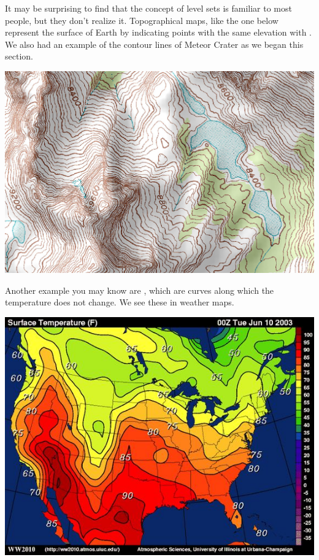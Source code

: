 \documentclass{ximera}
\begin{document}


It may be surprising to find that the concept of level sets is
familiar to most people, but they don't realize it.  Topographical
maps, like the one below represent the surface of Earth by
indicating points with the same elevation with .  We also had an example of the contour lines of Meteor 
  Crater as we began this section.

\begin{image}%
  \includegraphics{topomap.jpg}
\end{image}

Another example you may know are , which are curves along which the
temperature does not change. We see these in weather maps.

\begin{image}
  \includegraphics{isotherm.jpg}
\end{image}
\end{document}
